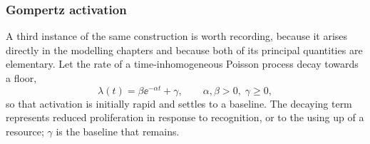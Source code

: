 %
%
%
%
%
%

\subsubsection{Gompertz activation}
\label{m:sec:gompertz}

A third instance of the same construction is worth recording, because it
arises directly in the modelling chapters and because both of its principal
quantities are elementary. Let the rate of a time-inhomogeneous Poisson
process decay towards a floor,
\begin{equation}
\lambda(t)=\beta\ee^{-\alpha t}+\gamma,
\qquad
\alpha,\beta>0,\;\gamma\ge0,
\label{m:eq:gompertzrate}
\end{equation}
so that activation is initially rapid and settles to a baseline. The
decaying term represents reduced proliferation in response to recognition,
or to the using up of a resource; $\gamma$ is the baseline that remains.

